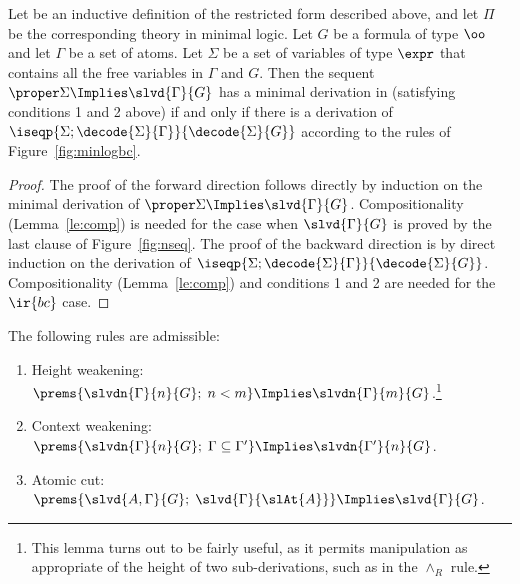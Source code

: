 \documentclass[final]{svjour3}
\begin{document}
\begin{lem}
Let  be an inductive definition of the restricted form
described above, and let $\Pi$ be the corresponding theory in minimal
logic.   
Let $G$ be a formula of type $\oo$ and let $\Gamma$ be a set of atoms.
Let $\Sigma$ be a set of variables of type $\expr$ that contains
all the free variables in $\Gamma$ and $G$.
Then the sequent $\proper\Sigma\Implies\slvd {\Gamma}{G}$ has a
minimal derivation in \HOL (satisfying conditions 1 and 2 above) if
and only if there is a derivation of
$\iseqp{\Sigma;\decode{\Sigma}{\Gamma}}{\decode{\Sigma}{G}}$ according
to the rules of Figure~\ref{fig:minlogbc}.
\label{lem:sladeq}
\end{lem}
\begin{proof}
The proof of the forward direction follows directly by induction on
the minimal derivation of $\proper\Sigma\Implies\slvd {\Gamma}{G}$.
Compositionality (Lemma~\ref{le:comp}) is needed for the case when
$\slvd {\Gamma}{G}$ is proved by the last clause of
Figure~\ref{fig:nseq}.
The proof of the backward direction is by
direct induction on the derivation of
$\iseqp{\Sigma;\decode{\Sigma}{\Gamma}}{\decode{\Sigma}{G}}$.
Compositionality (Lemma~\ref{le:comp}) and conditions 1 and 2 are
needed for the $\ir{bc}$ case.
\end{proof}


\begin{goal}
  The following rules are admissible:
\begin{enumerate}
\item Height weakening: $ \prems{\slvdn{\Gamma}{n}{G};\; n < m}
  \Implies \slvdn{\Gamma}{m}{G} $.\footnote{This lemma turns out to be
  fairly useful, as it permits manipulation as appropriate of the height
  of two sub-derivations, such as in the $\land_R$ rule.}
\item Context weakening: $ \prems{\slvdn{\Gamma}{n}{G};\; \Gamma\subseteq
    \Gamma'} \Implies \slvdn{\Gamma'}{n}{G} $.
\item Atomic cut: $ \prems{\slvd{A,\Gamma}{G};\;
    \slvd{\Gamma}{\slAt{A}}} \Implies \slvd{\Gamma}{G}$.
\end{enumerate}
\label{mcthm:struct}
 \end{goal}
 
\end{document}
